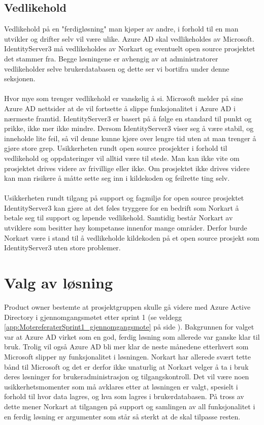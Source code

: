 \subsection{Vedlikehold}
\label{sec:valgAvLosning_muligeLosninger_vedlikehold}
Vedlikehold på en "ferdigløsning" man kjøper av andre, i forhold til en man utvikler og drifter selv vil være ulike. Azure AD skal vedlikeholdes av Microsoft. IdentityServer3 må vedlikeholdes av Norkart og eventuelt open source prosjektet det stammer fra. Begge løsningene er avhengig av at administratorer vedlikeholder selve brukerdatabasen og dette ser vi bortifra under denne seksjonen. 
\\
\\
Hvor mye som trenger vedlikehold er vanskelig å si. Microsoft melder på sine Azure AD nettsider at de vil fortsette å slippe funksjonalitet i Azure AD i nærmeste framtid. IdentityServer3 er basert på å følge en standard til punkt og prikke, ikke mer ikke mindre. Dersom IdentityServer3 viser seg å være stabil, og inneholde lite feil, så vil denne kunne kjøre over lengre tid uten at man trenger å gjøre store grep. Usikkerheten rundt open source prosjekter i forhold til vedlikehold og oppdateringer vil alltid være til stede. Man kan ikke vite om prosjektet drives videre av frivillige eller ikke. Om prosjektet ikke drives videre kan man risikere å måtte sette seg inn i kildekoden og feilrette ting selv.
\\
\\
Usikkerheten rundt tilgang på support og fagmiljø for open source prosjektet IdentityServer3 kan gjøre at det føles tryggere for en bedrift som Norkart å betale seg til support og løpende vedlikehold. Samtidig består Norkart av utviklere som besitter høy kompetanse innenfor mange områder. Derfor burde Norkart være i stand til å vedlikeholde kildekoden på et open source prosjekt som IdentityServer3 uten store problemer.

\section{Valg av løsning}
\label{sec:valgAvLosning_valgAvLosning}
Product owner bestemte at prosjektgruppen skulle gå videre med Azure Active Directory i gjennomgangsmøtet etter sprint 1 (se veldegg \ref{app:MotereferaterSprint1_gjennomgangsmote} på side \pageref{app:MotereferaterSprint1_gjennomgangsmote}). Bakgrunnen for valget var at Azure AD virket som en god, ferdig løsning som allerede var ganske klar til bruk. Trolig vil også Azure AD bli mer klar de neste månedene etterhvert som Microsoft slipper ny funksjonalitet i løsningen. Norkart har allerede svært tette bånd til Microsoft og det er derfor ikke unaturlig at Norkart velger å ta i bruk deres løsninger for brukeradministrasjon og tilgangskontroll. Det vil være noen usikkerhetsmomenter som må avklares etter at løsningen er valgt, spesielt i forhold til hvor data lagres, og hva som lagres i brukerdatabasen. På tross av dette mener Norkart at tilgangen på support og samlingen av all funksjonalitet i en ferdig løsning er argumenter som står så sterkt at de skal tilpasse resten.

